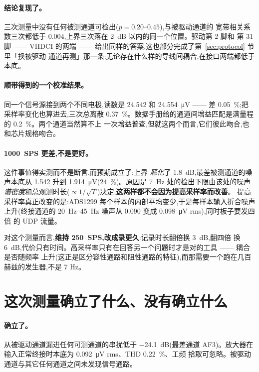 \documentclass[11pt]{ctexart}
\begin{document}
\paragraph{结论复现了。}三次测量中没有任何被测通道可检出($p = 0.20$–$0.45$),与被驱动通道的
宽带相关系数三次都低于 $0.004$,上界三次落在 \SI{2}{\deci\bel} 以内的同一个位置。驱动第 2 脚和
第 31 脚 —— VHDCI 的两端 —— 给出同样的答案,这也部分完成了第~\ref{sec:protocol} 节里「换被驱动
通道再测」那一条:无论存在什么样的导线间耦合,在接口两端都低于本底。

\paragraph{顺带得到的一个校准结果。}同一个信号源接到两个不同电极,读数是 \SI{24.542}{} 和
\SI{24.554}{\micro\volt} —— 差 \SI{0.05}{\percent};把采样率变化也算进去,三次总离散
\SI{0.37}{\percent}。数据手册给的通道间增益匹配是满量程的 \SI{0.2}{\percent}。两个通道当然算不上
一次增益普查,但就这两个而言,它们彼此吻合,也和芯片规格吻合。

\paragraph{\SI{1000}{SPS} 更差,不是更好。}这件事值得实测而不是断言,而预期成立了:上界
\emph{恶化}了 \SI{1.8}{\deci\bel},最差被测通道的噪声本底从 \SI{1.542}{} 升到
\SI{1.914}{\micro\volt}(\SI{+24}{\percent})。原因是 \SI{7}{\hertz} 处的检出下限由该处的噪声
\emph{谱密度}和总观测时长($\propto 1/\sqrt{T}$)决定,\textbf{这两样都不会因为提高采样率而改善}。
提高采样率真正改变的是:ADS1299 每个样本的内部平均变少,于是每样本输入折合噪声上升(终接通道的
\SIrange{20}{45}{\hertz} 噪声从 \SI{0.090}{} 变成 \SI{0.098}{\micro\volt} rms),同时板子要发四倍
的 UDP 流量。

对这个测量而言,\textbf{维持 \SI{250}{SPS},改成录更久}:记录时长翻倍换 \SI{3}{\deci\bel},翻四倍
换 \SI{6}{\deci\bel},代价只有时间。高采样率只有在回答另一个问题时才是对的工具 —— 耦合是否随频率
上升(这正是区分容性通路和阻性通路的特征),而那需要一个跑在几百赫兹的发生器,不是 7 Hz。

\section{这次测量确立了什么、没有确立什么}

\paragraph{确立了。}从被驱动通道漏进任何可测通道的串扰低于 \SI{-24.1}{\deci\bel}(最差通道
AF3)。放大器在输入正常终接时本底为 \SI{0.092}{\micro\volt} rms、THD \SI{0.22}{\percent}、工频
拾取可忽略。被驱动通道与其它任何通道之间未发现信号通路。
\end{document}

